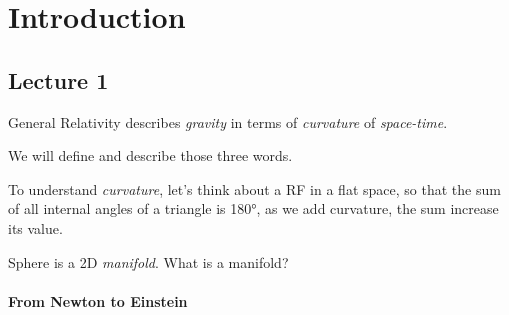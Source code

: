\chapter{Introduction}

\section{Lecture 1}

General Relativity describes \emph{gravity} in terms of \emph{curvature} of \emph{space-time}.

We will define and describe those three words. 

To understand \emph{curvature}, let's think about a RF in a flat space, so that the sum of all internal angles of a triangle is 180°, as we add curvature, the sum increase its value.

Sphere is a 2D \emph{manifold}. {\tiny What is a manifold?}

\subsubsection{From Newton to Einstein}


